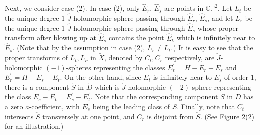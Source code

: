 \documentclass[11pt]{amsart}
\theoremstyle{plain}
\numberwithin{theorem}{section}
\theoremstyle{definition}
\newcommand{\C}{{\mathbb C}}
\renewcommand{\P}{{\mathbb P}}
\begin{document}
Next, we consider case (2). In case (2), only $\hat{E}_r$, $\hat{E}_s$ are points in
$\C\P^2$. Let $L_t$ be the unique degree $1$ $\hat{J}$-holomorphic sphere passing through
$\hat{E}_r$, $\hat{E}_s$, and let $L_r$ be the unique degree $1$ $\hat{J}$-holomorphic sphere
passing through $\hat{E}_s$ whose proper transform after blowing up at $\hat{E}_s$ contains the point $\hat{E}_t$ which is infinitely near to $\hat{E}_s$. (Note that by the assumption in case (2), $L_r\neq L_t$.) 
It is easy to see that the proper transforms of $L_t,L_r$ in
$\check{X}$, denoted by $C_t, C_r$ respectively, are $\check{J}$-holomorphic $(-1)$-spheres representing the classes $E_t^\prime=H-E_r-E_s$ and $E_r^\prime=H-E_s-E_t$. On the other hand, since $E_t$ is infinitely near to $E_s$ of order $1$, there is a component $\check{S}$ in $\check{D}$ which is $\check{J}$-holomorphic $(-2)$-sphere representing the class $E_s-E_t=E_s^\prime-E_t^\prime$. Note that the corresponding component 
$S$ in $D$ has a zero $a$-coefficient, with $E_s$ being the leading class of $S$. Finally, note that $C_t$ intersects $\check{S}$ transversely at one point, and $C_r$ is disjoint from $\check{S}$. (See Figure 2(2) for an illustration.)
\end{document}
